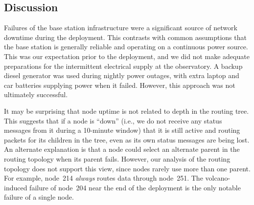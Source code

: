 


\subsection{Discussion}

Failures of the base station infrastructure were a significant source of
network downtime during the deployment.  This contrasts with common
assumptions that the base station is generally reliable and operating on a
continuous power source. This was our expectation prior to the deployment,
and we did not make adequate preparations for the intermittent electrical
supply at the observatory. A backup diesel generator was used during nightly
power outages, with extra laptop and car batteries supplying power when it
failed.  However, this approach was not ultimately successful.

It may be surprising that node uptime is not related to depth in the routing
tree. This suggests that if a node is ``down'' (i.e., we do not receive any
status messages from it during a 10-minute window) that it is still active
and routing packets for its children in the tree, even as its own status
messages are being lost. An alternate explanation is that a node could select
an alternate parent in the routing topology when its parent fails. However,
our analysis of the routing topology does not support this view, since nodes
rarely use more than one parent. For example, node~214 \textit{always} routes
data through node~251. The volcano-induced failure of node~204 near the end
of the deployment is the only notable failure of a single node.

